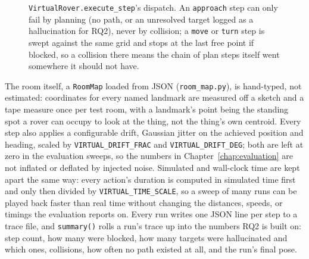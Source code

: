 \begin{figure}[htbp]
  \centering
  \caption{\texttt{VirtualRover.execute\_step}'s dispatch. An \texttt{approach} step can only fail by planning (no path, or an unresolved target logged as a hallucination for RQ2), never by collision; a \texttt{move} or \texttt{turn} step is swept against the same grid and stops at the last free point if blocked, so a collision there means the chain of plan steps itself went somewhere it should not have.}
  \label{fig:flow-virtualrover}
\end{figure}

The room itself, a \texttt{RoomMap} loaded from JSON
(\texttt{room\_map.py}), is hand-typed, not estimated: coordinates for every
named landmark are measured off a sketch and a tape measure once per test
room, with a landmark's point being the standing spot a rover can occupy to
look at the thing, not the thing's own centroid. Every step also applies a
configurable drift, Gaussian jitter on the achieved position and heading,
scaled by \texttt{VIRTUAL\_DRIFT\_FRAC} and \texttt{VIRTUAL\_DRIFT\_DEG}; both
are left at zero in the evaluation sweeps, so the numbers in
Chapter~\ref{chap:evaluation} are not inflated or deflated by injected
noise. Simulated and wall-clock time are kept apart the same way: every
action's duration is computed in simulated time first and only then divided
by \texttt{VIRTUAL\_TIME\_SCALE}, so a sweep of many runs can be played back
faster than real time without changing the distances, speeds, or timings
the evaluation reports on. Every run writes one JSON line per step to a
trace file, and \texttt{summary()} rolls a run's trace up into the numbers
RQ2 is built on: step count, how many were blocked, how many targets were
hallucinated and which ones, collisions, how often no path existed at all,
and the run's final pose.

